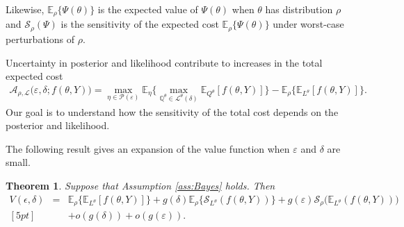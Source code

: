\documentclass[10pt,a4paper]{amsart}
\newtheorem{theorem}{Theorem}[section]
\numberwithin{equation}{section}
\numberwithin{theorem}{section}
\numberwithin{table}{section}
\numberwithin{figure}{section}
\begin{document}
Likewise, ${\mathbb E}_\rho \big\{\Psi(\theta) \big\}$ is the expected value of $\Psi(\theta)$ when $\theta$ has distribution $\rho$ and
${\mathcal S}_{\rho}(\Psi)$ is the sensitivity of the expected cost ${\mathbb E}_\rho \big\{\Psi(\theta) \big\}$ under worst-case perturbations of $\rho$. 
   
Uncertainty in posterior and likelihood contribute to increases in the total expected cost
   \begin{eqnarray*}
   {\mathcal A}_{\rho,{\mathcal L}}\big(\varepsilon, \delta; f(\theta, Y)\big) = \max_{\eta \in {\mathcal P}(\varepsilon)} {\mathbb E}_\eta \Big\{\max_{{\mathbb Q}^\theta \in {\mathcal L}^\theta(\delta)} {\mathbb E}_{Q^\theta} [f(\theta, Y)] \Big\} - {\mathbb E}_\rho \Big\{{\mathbb E}_{L^\theta}[f(\theta, Y)]  \Big\}.
   \end{eqnarray*}
Our goal is to understand how the sensitivity of the total cost depends on the posterior and likelihood.

The following result gives an expansion of the value function when $\varepsilon$ and $\delta$ are small. 
\begin{theorem} \label{prop:Bayesian expansion}
Suppose that Assumption \ref{ass:Bayes} holds. Then
\begin{eqnarray*}
V(\epsilon, \delta) & = & 
{\mathbb E}_\rho\Big\{{\mathbb E}_{L^\theta}[f(\theta, Y)] \Big\} + g(\delta){\mathbb E}_\rho\Big\{{\mathcal S}_{L^\theta}(f(\theta, Y))\Big\}  +  g(\varepsilon) {\mathcal S}_\rho\Big({\mathbb E}_{L^\theta}(f(\theta, Y))\Big) \\ [5pt] 
& & + o(g(\delta)) + o(g({\varepsilon})).
\end{eqnarray*}
\end{theorem}


\end{document}
